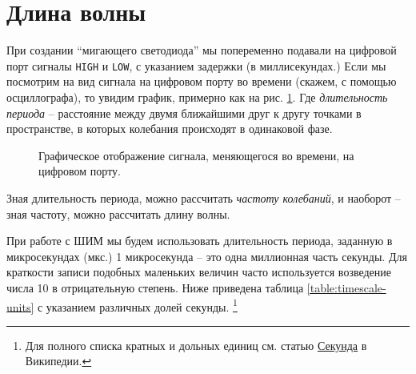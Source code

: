 \documentclass[../sparc.tex]{subfiles}
\begin{document}
\section{Длина волны}

При создании ``мигающего светодиода'' мы попеременно подавали на цифровой порт
сигналы \texttt{HIGH} и \texttt{LOW}, с указанием задержки (в миллисекундах.)
Если мы посмотрим на вид сигнала на цифровом порту во времени (скажем, с помощью
осциллографа), то увидим график, примерно как на
рис. \ref{fig:blinking-led-graph}.  Где \emph{длительность периода} -- расстояние
между двумя ближайшими друг к другу точками в пространстве, в которых колебания
происходят в одинаковой фазе.

\begin{figure}[ht]
  \caption{Графическое отображение сигнала, меняющегося во времени, на цифровом
    порту.}
  \label{fig:blinking-led-graph}
\end{figure}

Зная длительность периода, можно рассчитать \emph{частоту колебаний}, и наоборот
-- зная частоту, можно рассчитать длину волны.

При работе с \gls{ШИМ} мы будем использовать длительность периода, заданную в
микросекундах (мкс.)  1 микросекунда -- это одна миллионная часть секунды. Для
краткости записи подобных маленьких величин часто используется возведение числа
10 в отрицательную степень.  Ниже приведена таблица \ref{table:timescale-units}
с указанием различных долей секунды. \footnote{Для полного списка кратных и
дольных единиц см. статью
\href{https://ru.wikipedia.org/wiki/\%D0\%A1\%D0\%B5\%D0\%BA\%D1\%83\%D0\%BD\%D0\%B4\%D0\%B0}{Секунда}
в Википедии.}
\end{document}
